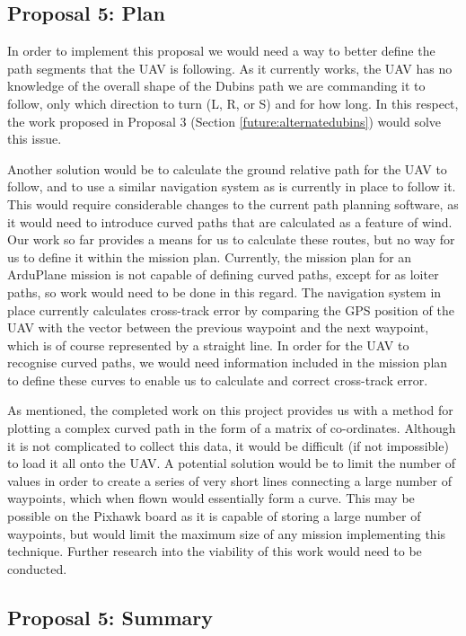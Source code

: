 \subsection{Proposal 5: Plan} 
\label{future:gustsplan}

In order to implement this proposal we would need a way to better define the path segments that the UAV is following. As it currently works, the UAV has no knowledge of the overall shape of the Dubins path we are commanding it to follow, only which direction to turn (L, R, or S) and for how long. In this respect, the work proposed in Proposal 3 (Section \ref{future:alternatedubins}) would solve this issue. 

Another solution would be to calculate the ground relative path for the UAV to follow, and to use a similar navigation system as is currently in place to follow it. This would require considerable changes to the current path planning software, as it would need to introduce curved paths that are calculated as a feature of wind. Our work so far provides a means for us to calculate these routes, but no way for us to define it within the mission plan. Currently, the mission plan for an ArduPlane mission is not capable of defining curved paths, except for as loiter paths, so work would need to be done in this regard. The navigation system in place currently calculates cross-track error by comparing the GPS position of the UAV with the vector between the previous waypoint and the next waypoint, which is of course represented by a straight line. In order for the UAV to recognise curved paths, we would need information included in the mission plan to define these curves to enable us to calculate and correct cross-track error. 

As mentioned, the completed work on this project provides us with a method for plotting a complex curved path in the form of a matrix of co-ordinates. Although it is not complicated to collect this data, it would be difficult (if not impossible) to load it all onto the UAV. A potential solution would be to limit the number of values in order to create a series of very short lines connecting a large number of waypoints, which when flown would essentially form a curve. This may be possible on the Pixhawk board as it is capable of storing a large number of waypoints, but would limit the maximum size of any mission implementing this technique. Further research into the viability of this work would need to be conducted.

\subsection{Proposal 5: Summary} 
\label{future:gustssummary}

